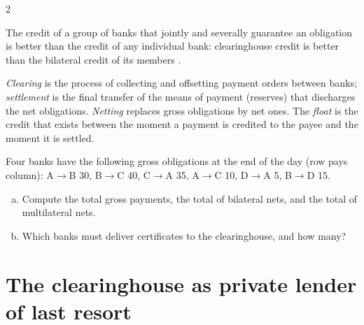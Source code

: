 \begin{paracol}{2}
\begin{proposition}
The credit of a group of banks that jointly and severally guarantee an obligation is better than the credit of any individual bank: clearinghouse
credit is better than the bilateral credit of its members .
\end{proposition}

\begin{definition}
\emph{Clearing} is the process of collecting and offsetting payment orders between banks; \emph{settlement} is the final transfer of the means of
payment (reserves) that discharges the net obligations. \emph{Netting} replaces gross obligations by net ones. The \emph{float} is the credit that
exists between the moment a payment is credited to the payee and the moment it is settled.
\end{definition}

\begin{exercise}[Netting]
Four banks have the following gross obligations at the end of the day (row pays column): A$\to$B 30, B$\to$C 40, C$\to$A 35, A$\to$C 10, D$\to$A 5, B$\to$D 15.
\begin{enumerate}[(a)]
  \item Compute the total gross payments, the total of bilateral nets, and the total of multilateral nets.
  \item Which banks must deliver certificates to the clearinghouse, and how many?
\end{enumerate}
\end{exercise}

\section{The clearinghouse as private lender of last resort}\label{sec:ch-lolr}


\end{paracol}
